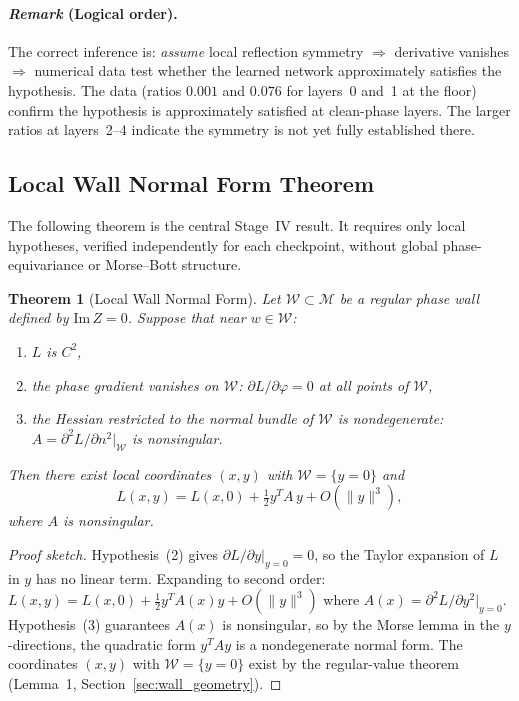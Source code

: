 \documentclass[11pt]{amsart}
\newtheorem{theorem}{Theorem}[section]
\begin{document}
\paragraph{\textit{Remark} (Logical order).}
The correct inference is:
\emph{assume} local reflection symmetry $\Rightarrow$
derivative vanishes $\Rightarrow$
numerical data test whether the learned network approximately
satisfies the hypothesis.
The data (ratios $0.001$ and $0.076$ for layers~0 and~1 at the floor)
confirm the hypothesis is approximately satisfied at clean-phase layers.
The larger ratios at layers~2--4 indicate the symmetry is not yet
fully established there.

\subsection{Local Wall Normal Form Theorem}
\label{sec:normal_form}

The following theorem is the central Stage~IV result.
It requires only local hypotheses, verified independently for each
checkpoint, without global phase-equivariance or Morse--Bott structure.

\begin{theorem}[Local Wall Normal Form]
\label{thm:normal_form}
Let $\mathcal{W} \subset \mathcal{M}$ be a regular phase wall defined by
$\mathrm{Im}\,Z = 0$. Suppose that near $w \in \mathcal{W}$:
\begin{enumerate}
\item $L$ is $C^2$,
\item the phase gradient vanishes on $\mathcal{W}$:
  $\partial L/\partial\varphi = 0$ at all points of $\mathcal{W}$,
\item the Hessian restricted to the normal bundle of $\mathcal{W}$
  is nondegenerate: $A = \partial^2 L/\partial n^2|_{\mathcal{W}}$
  is nonsingular.
\end{enumerate}
Then there exist local coordinates $(x,y)$ with $\mathcal{W} = \{y=0\}$ and
\[
  L(x,y) = L(x,0) + \tfrac{1}{2} y^T A\, y + O(\|y\|^3),
\]
where $A$ is nonsingular.
\end{theorem}

\begin{proof}[Proof sketch]
Hypothesis~(2) gives $\partial L/\partial y|_{y=0} = 0$, so the Taylor
expansion of $L$ in $y$ has no linear term.
Expanding to second order:
$L(x,y) = L(x,0) + \tfrac{1}{2} y^T A(x) y + O(\|y\|^3)$
where $A(x) = \partial^2 L/\partial y^2|_{y=0}$.
Hypothesis~(3) guarantees $A(x)$ is nonsingular, so by the Morse lemma
in the $y$-directions, the quadratic form $y^T A y$ is a nondegenerate
normal form. The coordinates $(x,y)$ with $\mathcal{W}=\{y=0\}$
exist by the regular-value theorem (Lemma~1, Section~\ref{sec:wall_geometry}).
\end{proof}
\end{document}
